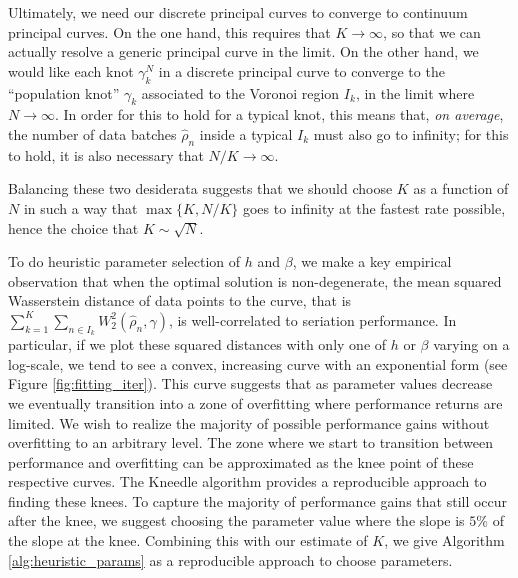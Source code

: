 \documentclass[aos, preprint]{imsart}
\theoremstyle{plain}
\theoremstyle{remark}
\begin{document}
\begin{appendix}
Ultimately, we need our discrete principal curves to converge to
continuum principal curves. On the one hand, this requires that
$K\rightarrow \infty$, so that we can actually resolve a generic
principal curve in the limit. On the other hand, we would like each
knot $\gamma_k^N$ in a discrete principal curve to converge to the
``population knot'' $\gamma_k$ associated to the Voronoi region $I_k$, in the limit where $N\rightarrow \infty$. In order for this to hold for a typical knot, this means that, \emph{on average}, the number of data batches $\hat{\rho}_n$ inside a typical $I_k$ must also go to infinity; for this to hold, it is also necessary that $N/K \rightarrow \infty$.

Balancing these two desiderata suggests that we should choose $K$ as a function of $N$ in such a way that $\max\{{K,N/K}\}$  goes to infinity at the fastest rate possible, hence the choice that $K \sim \sqrt{N}$.

To do heuristic parameter selection of $h$ and $\beta$, we make a key empirical observation that when the optimal solution is non-degenerate, the mean squared Wasserstein distance of data points to the curve, that is $\sum_{k=1}^{K}\sum_{n\in I_{k}}W_2^2(\hat{\rho}_{n},\gamma)$, is well-correlated to seriation performance. In particular, if we plot these squared distances with only one of $h$ or $\beta$ varying on a log-scale, we tend to see a convex, increasing curve with an exponential form (see Figure \ref{fig:fitting_iter}). This curve suggests that as parameter values decrease we eventually transition into a zone of overfitting where performance returns are limited. We wish to realize the majority of possible performance gains without overfitting to an arbitrary level. The zone where we start to transition between performance and overfitting can be approximated as the knee point of these respective curves. The Kneedle algorithm \cite{kneedle} provides a reproducible approach to finding these knees. To capture the majority of performance gains  that still occur after the knee, we suggest choosing the parameter value where the slope is $5\%$ of the slope at the knee. Combining this with our estimate of $K$, we give Algorithm \ref{alg:heuristic_params} as a reproducible approach to choose parameters.

\begin{algorithm}[H]
    \caption{Heuristic Parameter Selection}\label{alg:heuristic_params}



\end{algorithm}
\end{appendix}
\end{document}
